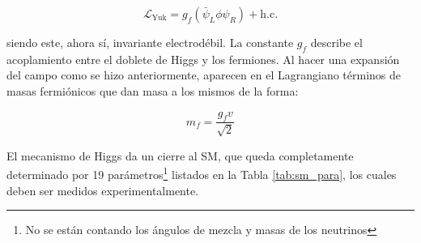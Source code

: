 \begin{equation}
	\mathcal{L}_{\text{Yuk}} = g_f(\bar{\psi}_L\phi \psi_R) + \text{h.c.}
\end{equation}

\noindent
siendo este, ahora sí, invariante electrodébil. 
La constante $g_f$ describe el acoplamiento entre el doblete de Higgs y los fermiones. Al hacer una expansión del campo como se hizo anteriormente, aparecen en el Lagrangiano términos de masas fermiónicos que dan masa a los mismos de la forma:

\begin{equation}
m_f = \frac{g_f v}{\sqrt{2}}
\end{equation}

El mecanismo de Higgs da un cierre al SM, que queda completamente determinado por 19 parámetros\footnote{No se están contando los ángulos de mezcla y masas de los neutrinos} listados en la Tabla \ref{tab:sm_para}, los cuales deben ser medidos experimentalmente.


